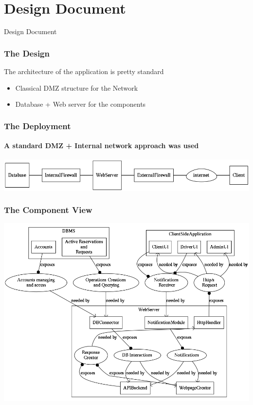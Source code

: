 \documentclass[10pt,xcolor={usenames,dvipsnames}]{beamer}
\begin{document}
\section[Section]{Design Document}
\begin{frame}
	\begin{center}
		Design Document
	\end{center}
\end{frame}
\begin{frame}
	\frametitle{The Design}
	The architecture of the application is pretty standard
	\begin{itemize}
		\item Classical DMZ structure for the Network 
		\item Database + Web server for the components
	\end{itemize}
\end{frame}
\begin{frame}
	\frametitle{The Deployment}
	\framesubtitle{A standard DMZ + Internal network approach was used}
	\begin{center}
		\includegraphics[width=\textwidth,height=\textheight,keepaspectratio]{dot/deployment}
	\end{center}
\end{frame}
\begin{frame}
	\frametitle{The Component View}
	\begin{center}
		\includegraphics[width=\textwidth,height=\textheight,keepaspectratio]{dot/component}
	\end{center}
\end{frame}
\end{document}

